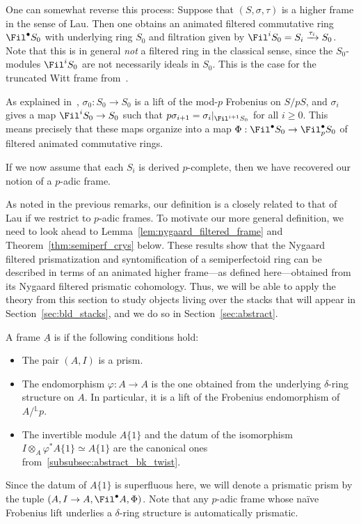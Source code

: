 \documentclass[10pt]{amsart}
\begin{document}
\begin{remark}
\label{rem:relationship_with_lau_reverse}
One can somewhat reverse this process: Suppose that $(S,\sigma,\tau)$ is a higher frame in the sense of Lau. Then one obtains an animated filtered commutative ring $\Fil^\bullet S_0$ with underlying ring $S_0$ and filtration given by $\Fil^i S_0 = S_i\xrightarrow{\tau_i} S_0$. Note that this is in general \emph{not} a filtered ring in the classical sense, since the $S_0$-modules $\Fil^i S_0$ are not necessarily ideals in $S_0$. This is the case for the truncated Witt frame from~\cite[Example 2.1.6]{MR4355476}.

As explained in~\cite[Remark 2.0.2]{MR4355476}, $\sigma_0:S_0\to S_0$ is a lift of the mod-$p$ Frobenius on $S/pS$, and $\sigma_i$ gives a map $\Fil^iS_0 \to S_0$ such that $p\sigma_{i+1} = \sigma_i\vert_{\Fil^{i+1}S_0}$ for all $i\ge 0$. This means precisely that these maps organize into a map $\Phi:\Fil^\bullet S_0\to \Fil^\bullet_pS_0$ of filtered animated commutative rings. 

If we now assume that each $S_i$ is derived $p$-complete, then we have recovered our notion of a $p$-adic frame. 
\end{remark}

\begin{remark}
\label{rem:reason_for_I}
As noted in the previous remarks, our definition is a closely related to that of Lau if we restrict to $p$-adic frames. To motivate our more general definition, we need to look ahead to Lemma~\ref{lem:nygaard_filtered_frame} and Theorem~\ref{thm:semiperf_crys} below. These results show that the Nygaard filtered prismatization and syntomification of a semiperfectoid ring can be described in terms of an animated higher frame---as defined here---obtained from its Nygaard filtered prismatic cohomology. Thus, we will be able to apply the theory from this section to study objects living over the stacks that will appear in Section~\ref{sec:bld_stacks}, and we do so in Section~\ref{sec:abstract}.
\end{remark}


\begin{definition}
\label{defn:prismatic_frames}
A frame $\underline{A}$ is  if the following conditions hold:
\begin{itemize}
   \item The pair $(A,I)$ is a prism.
   \item The endomorphism $\varphi:A\to A$ is the one obtained from the underlying $\delta$-ring structure on $A$. In particular, it is a lift of the Frobenius endomorphism of $A/{}^{\mathbb{L}}p$.
   \item The invertible module $A\{1\}$ and the datum of the isomorphism $I\otimes_A\varphi^*A\{1\}\simeq A\{1\}$ are the canonical ones from~\eqref{subsubsec:abstract_bk_twist}.
\end{itemize}
Since the datum of $A\{1\}$ is superfluous here, we will denote a prismatic prism by the tuple $(A,I\to A,\Fil^\bullet A,\Phi)$. Note that any $p$-adic frame whose na\"ive Frobenius lift underlies a $\delta$-ring structure is automatically prismatic.
\end{definition}
\end{document}
